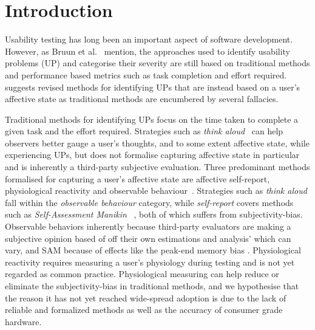	
\section{Introduction}

Usability testing has long been an important aspect of software development.
However, as Bruun et al.~\cite{LH-paper} mention, the approaches used to
identify usability problems (UP) and categorise their severity are still based
on traditional methods and performance based metrics such as task completion and effort required. \cite{LH-paper} suggests revised methods
for identifying UPs that are instead based on a user's affective state as
traditional methods are encumbered by several fallacies.


Traditional methods for identifying UPs focus on the time taken to complete a
given task and the effort required. Strategies such as \textit{think
aloud}~\cite{use_of_TA_and_IDA} can help observers better gauge a user's
thoughts, and to some extent affective state, while experiencing UPs, but does
not formalise capturing affective state in particular and is inherently a third-party
subjective evaluation. Three predominant methods formalised for capturing a
user's affective state are affective self-report, physiological reactivity and
observable behaviour~\cite{BRADLEY199449}. Strategies such as \textit{think
aloud} fall within the \textit{observable behaviour} category, while
\textit{self-report} covers methods such as \textit{Self-Assessment Manikin}
~\cite{BRADLEY199449}, both of which suffers from 
subjectivity-bias. Observable behaviors inherently because third-party evaluators are making a subjective opinion based of off their own estimations and analysis' which can vary\cite{eval_effect}, and SAM because of effects like the peak-end memory bias \cite{cockburn_peakend}. Physiological reactivity requires measuring a
user's physiology during testing and is not yet regarded as common practice\cite{9th_semester_project}.  Physiological measuring can help reduce or
eliminate the subjectivity-bias in traditional methods, and we hypothesise that
the reason it has not yet reached wide-spread adoption is due to the lack of
reliable and formalized methods as well as the accuracy of consumer grade hardware.

